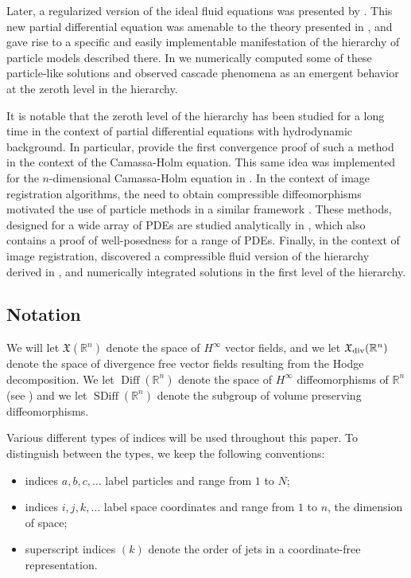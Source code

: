 \documentclass[12pt]{amsart}
\newcommand{\R}{\ensuremath{\mathbb{R}}}
\DeclareMathOperator{\SDiff}{SDiff}
\DeclareMathOperator{\Diff}{Diff}
\begin{document}
 Later, a regularized version of the ideal fluid equations was presented by
 \cite{MumfordMichor2013}.
 This new partial differential equation was amenable to the theory presented in 
 \cite{JacobsRatiuDesbrun2013}, and gave rise to a specific and easily
 implementable manifestation of the hierarchy of particle models
 described there.
 In \cite{CotterHolmJacobsMeier2014} we numerically computed some
 of these particle-like solutions and observed cascade phenomena as
 an emergent behavior at the zeroth level in the hierarchy.

 It is notable that the zeroth level of the hierarchy has been studied
 for a long time in the context of partial differential equations with hydrodynamic background.
 In particular, \cite{HoldenRaynaud2006} provide the first convergence proof of such a method in the context of the Camassa-Holm equation.
 This same idea was implemented for the $n$-dimensional Camassa-Holm
 equation in \cite{ChertockDuToitMarsden2012}.
 In the context of image registration algorithms, the need to obtain
 compressible diffeomorphisms motivated the use of particle methods
 in a similar framework \cite{JoshiMiller2000}.
 These methods, designed for a wide array of PDEs are studied analytically
 in \cite{TrouveYounes2005}, which also contains a proof of well-posedness
 for a range of PDEs.
 Finally, in the context of image registration, \cite{Sommer2013} 
 discovered a compressible fluid version of the hierarchy derived in \cite{JacobsRatiuDesbrun2013},
 and numerically integrated solutions in the first level of the hierarchy.

\subsection{Notation}
We will let $\mathfrak{X}(\R^n)$ denote the space of $H^\infty$ vector fields,
and we let $\mathfrak{X}_{\rm div}(\R^n)$
denote the space of divergence free vector fields resulting from the Hodge decomposition.
We let $\Diff(\R^n)$ denote the space of $H^\infty$ diffeomorphisms of $\R^n$  (see \cite{MichorMumford2013})
and we let $\SDiff(\R^n)$ denote the subgroup of volume preserving diffeomorphisms.

Various different types of indices will be used throughout this paper.
To distinguish between the types, we keep the following
conventions:
\begin{itemize}
\item indices $a,b,c,\ldots$ label particles and range from $1$ to $N$;
\item indices $i,j,k,\ldots$ label space coordinates and range from
  $1$ to $n$, the dimension of space;
\item superscript indices $(k)$ denote the order of jets in a
  coordinate-free representation.
\end{itemize}
\end{document}
